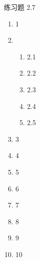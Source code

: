 \documentclass[a4paper, 12pt]{ctexart}
\begin{document}
\pagestyle{empty}

\begin{center}
    {\heiti 练习题 2.7}
\end{center}

\begin{enumerate}
    \item 1
    \item %
        \begin{enumerate}[(1)]
            \item 2.1
            \item 2.2
            \item 2.3
            \item 2.4
            \item 2.5
        \end{enumerate}
    \item 3
    \item 4
    \item 5
    \item 6
    \item 7
    \item 8
    \item 9
    \item 10
\end{enumerate}
\end{document}

